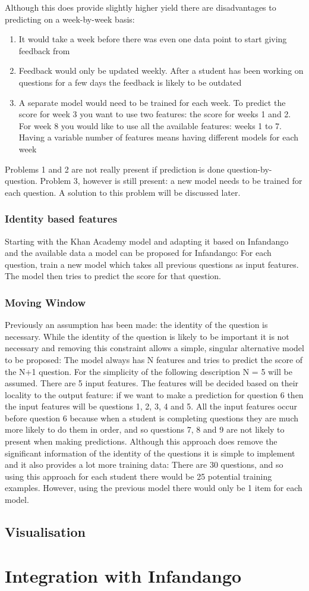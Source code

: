 Although this does provide slightly higher yield there are disadvantages to predicting on a week-by-week basis:

\begin{enumerate}
\item It would take a week before there was even one data point to start giving feedback from
\item Feedback would only be updated weekly. After a student has been working on questions for a few days the feedback is likely to be outdated
\item A separate model would need to be trained for each week. To predict the score for week 3 you want to use two features: the score for weeks 1 and 2. For week 8 you would like to use all the available features: weeks 1 to 7. Having a variable number of features means having different models for each week
\end{enumerate}

Problems 1 and 2 are not really present if prediction is done question-by-question. Problem 3, however is still present: a new model needs to be trained for each question. A solution to this problem will be discussed later.

\subsubsection{Identity based features}
Starting with the Khan Academy model and adapting it based on Infandango and the available data a model can be proposed for Infandango: For each question, train a new model which takes all previous questions as input features. The model then tries to predict the score for that question.

\subsubsection{Moving Window}
Previously an assumption has been made: the identity of the question is necessary. While the identity of the question is likely to be important it is not necessary and removing this constraint allows a simple, singular alternative model to be proposed: The model always has N features and tries to predict the score of the N+1 question. For the simplicity of the following description N = 5 will be assumed.
There are 5 input features. The features will be decided based on their locality to the output feature: if we want to make a prediction for question 6 then the input features will be questions 1, 2, 3, 4 and 5. All the input features occur before question 6 because when a student is completing questions they are much more likely to do them in order, and so questions 7, 8 and 9 are not likely to present when making predictions. 
Although this approach does remove the significant information of the identity of the questions it is simple to implement and it also provides a lot more training data: There are 30 questions, and so using this approach for each student there would be 25 potential training examples. However, using the previous model there would only be 1 item for each model.



\subsection{Visualisation}


\section{Integration with Infandango}

